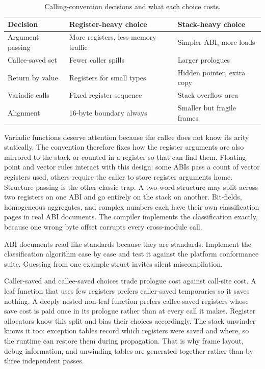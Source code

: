 \begin{table}[htbp]
\caption{Calling-convention decisions and what each choice costs.}
\label{tab:ch24-convention-choices}
\begin{tabular}{lll}
\toprule
Decision & Register-heavy choice & Stack-heavy choice \\
\midrule
Argument passing & More registers, less memory traffic & Simpler ABI, more loads \\
Callee-saved set & Fewer caller spills & Larger prologues \\
Return by value & Registers for small types & Hidden pointer, extra copy \\
Variadic calls & Fixed register sequence & Stack overflow area \\
Alignment & 16-byte boundary always & Smaller but fragile frames \\
\bottomrule
\end{tabular}
\end{table}

Variadic functions deserve attention because the callee does not know its arity statically.
The convention therefore fixes how the register arguments are also mirrored to the stack or counted in a register so that  can find them.
Floating-point and vector rules interact with this design: some ABIs pass a count of vector registers used, others require the caller to store register arguments home.
Structure passing is the other classic trap.
A two-word structure may split across two registers on one ABI and go entirely on the stack on another.
Bit-fields, homogeneous aggregates, and complex numbers each have their own classification pages in real ABI documents.
The compiler implements the classification exactly, because one wrong byte offset corrupts every cross-module call.
\begin{ccnote}
ABI documents read like standards because they are standards.
Implement the classification algorithm case by case and test it against the platform conformance suite.
Guessing from one example struct invites silent miscompilation.
\end{ccnote}

Caller-saved and callee-saved choices trade prologue cost against call-site cost.
A leaf function that uses few registers prefers caller-saved temporaries so it saves nothing.
A deeply nested non-leaf function prefers callee-saved registers whose save cost is paid once in its prologue rather than at every call it makes.
Register allocators know this split and bias their choices accordingly.
The stack unwinder knows it too: exception tables record which registers were saved and where, so the runtime can restore them during propagation.
That is why frame layout, debug information, and unwinding tables are generated together rather than by three independent passes.

